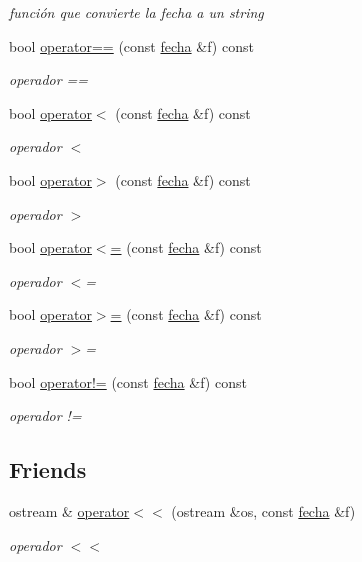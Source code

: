 \begin{DoxyCompactItemize}
\begin{DoxyCompactList}\small\item\em función que convierte la fecha a un string \end{DoxyCompactList}\item 
bool \hyperlink{classfecha_ac971e131a6e3edf57c2313468524f364}{operator==} (const \hyperlink{classfecha}{fecha} \&f) const 
\begin{DoxyCompactList}\small\item\em operador == \end{DoxyCompactList}\item 
bool \hyperlink{classfecha_a27803300b9698e1a40ef48f2009948c5}{operator$<$} (const \hyperlink{classfecha}{fecha} \&f) const 
\begin{DoxyCompactList}\small\item\em operador $<$ \end{DoxyCompactList}\item 
bool \hyperlink{classfecha_aaded7646e80d88492b31b17b4fb001fd}{operator$>$} (const \hyperlink{classfecha}{fecha} \&f) const 
\begin{DoxyCompactList}\small\item\em operador $>$ \end{DoxyCompactList}\item 
bool \hyperlink{classfecha_a8dfb2f2a7424bdb1dacc6df122b0a0c8}{operator$<$=} (const \hyperlink{classfecha}{fecha} \&f) const 
\begin{DoxyCompactList}\small\item\em operador $<$= \end{DoxyCompactList}\item 
bool \hyperlink{classfecha_a98d0f3009cb7205b5ddb3b81596d9cc7}{operator$>$=} (const \hyperlink{classfecha}{fecha} \&f) const 
\begin{DoxyCompactList}\small\item\em operador $>$= \end{DoxyCompactList}\item 
bool \hyperlink{classfecha_a1f6d28759c45b138efb80d25a7c398b8}{operator!=} (const \hyperlink{classfecha}{fecha} \&f) const 
\begin{DoxyCompactList}\small\item\em operador != \end{DoxyCompactList}\end{DoxyCompactItemize}
\subsection*{Friends}
\begin{DoxyCompactItemize}
\item 
ostream \& \hyperlink{classfecha_a9787de38b43ae62ba2c0812f3dd18394}{operator$<$$<$} (ostream \&os, const \hyperlink{classfecha}{fecha} \&f)
\begin{DoxyCompactList}\small\item\em operador $<$$<$ \end{DoxyCompactList}\end{DoxyCompactItemize}


